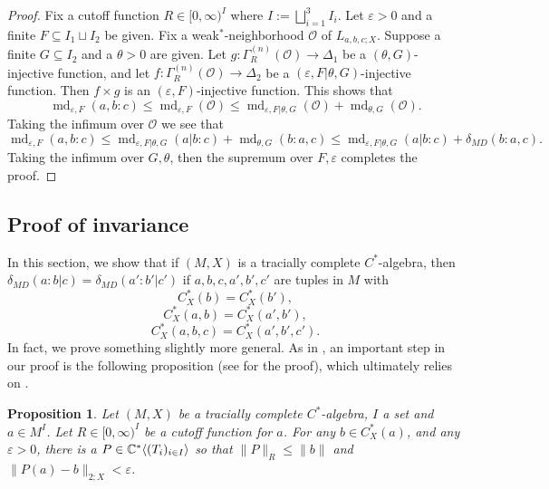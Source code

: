 \documentclass[10pt]{amsart}
\newtheorem{prop}[thm]{Proposition}
\theoremstyle{definition}
\numberwithin{equation}{section}
\newcommand{\bC}{{\mathbb C}}
\DeclareMathOperator{\md}{md}
\DeclarePairedDelimiter{\ip}{\langle}{\rangle}
\begin{document}
\begin{proof}
Fix a cutoff function $R\in [0,\infty)^{I}$ where $I:=\bigsqcup_{i=1}^{3}I_{i}$. Let $\varepsilon>0$ and a finite $F\subseteq I_{1}\sqcup I_{2}$ be given. 
Fix a weak$^{*}$-neighborhood $\mathcal{O}$ of $L_{a,b,c;X}$. Suppose a finite $G\subseteq I_{2}$ and a $\theta>0$ are given. Let $g\colon \Gamma^{(n)}_{R}(\mathcal{O})\to \Delta_{1}$ be a $(\theta,G)$-injective function, and let $f\colon \Gamma^{(n)}_{R}(\mathcal{O})\to \Delta_{2}$ be a $(\varepsilon,F|\theta,G)$-injective function. Then $f\times g$ is an $(\varepsilon,F)$-injective function. This shows that 
\[\md_{\varepsilon,F}(a,b:c)\leq \md_{\varepsilon,F}(\mathcal{O})\leq \md_{\varepsilon,F|\theta,G}(\mathcal{O})+\md_{\theta,G}(\mathcal{O}).\]
Taking the infimum over $\mathcal{O}$ we see that
\[\md_{\varepsilon,F}(a,b:c)\leq \md_{\varepsilon,F|\theta,G}(a|b:c)+\md_{\theta,G}(b:a,c)\leq \md_{\varepsilon,F|\theta,G}(a|b:c)+\delta_{MD}(b:a,c).\]
Taking the infimum over $G,\theta$, then the supremum over $F,\varepsilon$ completes the proof. 

\end{proof}




\subsection{Proof of invariance}

In this section, we show that if $(M,X)$ is a tracially complete $C^{*}$-algebra, then $\delta_{MD}(a:b|c)=\delta_{MD}(a':b'|c')$ if $a,b,c,a',b',c'$ are tuples in $M$ with 
\[C^{*}_{X}(b)=C^{*}_{X}(b'),\]
\[C^{*}_{X}(a,b)=C^{*}_{X}(a',b'),\]
\[C^{*}_{X}(a,b,c)=C^{*}_{X}(a',b',c').\]
In fact, we prove something slightly more general.
As in \cite{Hayes2018, macmahon20261boundedentropycalgebras}, an important step in our proof is the following proposition (see \cite[Corollary 5.1]{macmahon20261boundedentropycalgebras} for the proof), which ultimately relies on \cite[Proposition 3.28]{TraciallyComplete}. 

\begin{prop}\label{prop: better KDT}
Let $(M,X)$ be a tracially complete $C^{*}$-algebra, $I$ a set and $a\in M^{I}$. Let $R\in [0,\infty)^{I}$ be a cutoff function for $a$. For any $b\in C^{*}_{X}(a)$, and any $\varepsilon>0$, there is a $P\in \bC^{*}\ip{(T_{i})_{i\in I}}$ so that $\|P\|_{R}\leq \|b\|$ and $\|P(a)-b\|_{2;X}<\varepsilon$. 
\end{prop}
\end{document}

